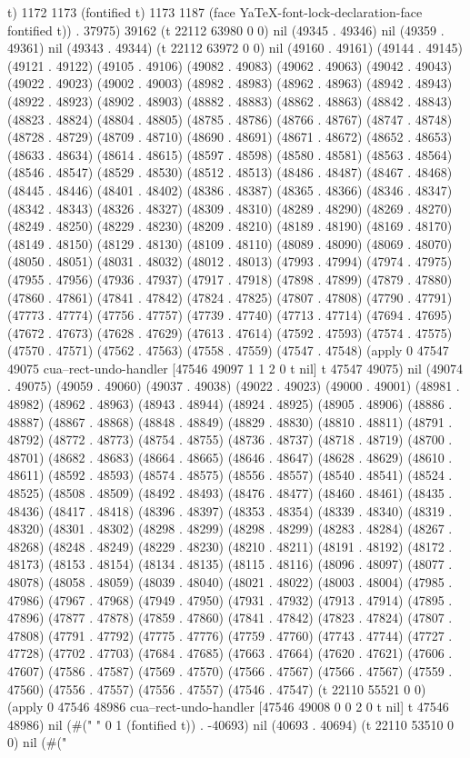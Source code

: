 t) 1172 1173 (fontified t) 1173 1187 (face YaTeX-font-lock-declaration-face fontified t)) . 37975) 39162 (t 22112 63980 0 0) nil (49345 . 49346) nil (49359 . 49361) nil (49343 . 49344) (t 22112 63972 0 0) nil (49160 . 49161) (49144 . 49145) (49121 . 49122) (49105 . 49106) (49082 . 49083) (49062 . 49063) (49042 . 49043) (49022 . 49023) (49002 . 49003) (48982 . 48983) (48962 . 48963) (48942 . 48943) (48922 . 48923) (48902 . 48903) (48882 . 48883) (48862 . 48863) (48842 . 48843) (48823 . 48824) (48804 . 48805) (48785 . 48786) (48766 . 48767) (48747 . 48748) (48728 . 48729) (48709 . 48710) (48690 . 48691) (48671 . 48672) (48652 . 48653) (48633 . 48634) (48614 . 48615) (48597 . 48598) (48580 . 48581) (48563 . 48564) (48546 . 48547) (48529 . 48530) (48512 . 48513) (48486 . 48487) (48467 . 48468) (48445 . 48446) (48401 . 48402) (48386 . 48387) (48365 . 48366) (48346 . 48347) (48342 . 48343) (48326 . 48327) (48309 . 48310) (48289 . 48290) (48269 . 48270) (48249 . 48250) (48229 . 48230) (48209 . 48210) (48189 . 48190) (48169 . 48170) (48149 . 48150) (48129 . 48130) (48109 . 48110) (48089 . 48090) (48069 . 48070) (48050 . 48051) (48031 . 48032) (48012 . 48013) (47993 . 47994) (47974 . 47975) (47955 . 47956) (47936 . 47937) (47917 . 47918) (47898 . 47899) (47879 . 47880) (47860 . 47861) (47841 . 47842) (47824 . 47825) (47807 . 47808) (47790 . 47791) (47773 . 47774) (47756 . 47757) (47739 . 47740) (47713 . 47714) (47694 . 47695) (47672 . 47673) (47628 . 47629) (47613 . 47614) (47592 . 47593) (47574 . 47575) (47570 . 47571) (47562 . 47563) (47558 . 47559) (47547 . 47548) (apply 0 47547 49075 cua--rect-undo-handler [47546 49097 1 1 2 0 t nil] t 47547 49075) nil (49074 . 49075) (49059 . 49060) (49037 . 49038) (49022 . 49023) (49000 . 49001) (48981 . 48982) (48962 . 48963) (48943 . 48944) (48924 . 48925) (48905 . 48906) (48886 . 48887) (48867 . 48868) (48848 . 48849) (48829 . 48830) (48810 . 48811) (48791 . 48792) (48772 . 48773) (48754 . 48755) (48736 . 48737) (48718 . 48719) (48700 . 48701) (48682 . 48683) (48664 . 48665) (48646 . 48647) (48628 . 48629) (48610 . 48611) (48592 . 48593) (48574 . 48575) (48556 . 48557) (48540 . 48541) (48524 . 48525) (48508 . 48509) (48492 . 48493) (48476 . 48477) (48460 . 48461) (48435 . 48436) (48417 . 48418) (48396 . 48397) (48353 . 48354) (48339 . 48340) (48319 . 48320) (48301 . 48302) (48298 . 48299) (48298 . 48299) (48283 . 48284) (48267 . 48268) (48248 . 48249) (48229 . 48230) (48210 . 48211) (48191 . 48192) (48172 . 48173) (48153 . 48154) (48134 . 48135) (48115 . 48116) (48096 . 48097) (48077 . 48078) (48058 . 48059) (48039 . 48040) (48021 . 48022) (48003 . 48004) (47985 . 47986) (47967 . 47968) (47949 . 47950) (47931 . 47932) (47913 . 47914) (47895 . 47896) (47877 . 47878) (47859 . 47860) (47841 . 47842) (47823 . 47824) (47807 . 47808) (47791 . 47792) (47775 . 47776) (47759 . 47760) (47743 . 47744) (47727 . 47728) (47702 . 47703) (47684 . 47685) (47663 . 47664) (47620 . 47621) (47606 . 47607) (47586 . 47587) (47569 . 47570) (47566 . 47567) (47566 . 47567) (47559 . 47560) (47556 . 47557) (47556 . 47557) (47546 . 47547) (t 22110 55521 0 0) (apply 0 47546 48986 cua--rect-undo-handler [47546 49008 0 0 2 0 t nil] t 47546 48986) nil (#(" " 0 1 (fontified t)) . -40693) nil (40693 . 40694) (t 22110 53510 0 0) nil (#("
